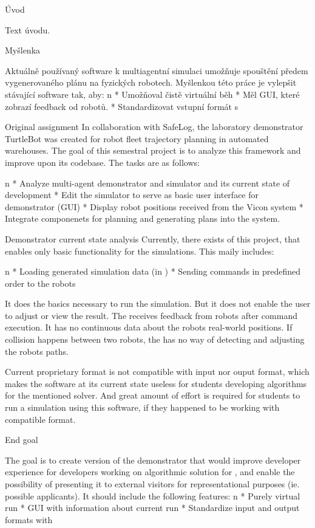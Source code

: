 \chap Úvod


Text úvodu.

\sec Myšlenka

Aktuálně používaný software k multiagentní simulaci umožňuje spouštění předem vygenerovaného plánu na fyzických robotech. Myšlenkou této práce je vylepšit stávající software tak, aby:
\begitems \style n
    * Umožňoval čistě virtuální běh
    * Měl GUI, které zobrazí feedback od robotů.
    * Standardizovat vstupní formát s \mapfIR
\enditems

\sec Original assignment
In collaboration with SafeLog, the laboratory demonstrator TurtleBot was created for robot fleet trajectory planning in automated warehouses. The goal of this semestral project is to analyze this framework and improve upon its codebase. The tasks are as follows:

\begitems \style n
    * Analyze multi-agent demonstrator and simulator {\mapfIR} and its current state of development 
    * Edit the simulator to serve as basic user interface for demonstrator (GUI)
    * Display robot positions received from the Vicon system
    * Integrate componenets for planning and generating plans into the system.
\enditems

\sec Demonstrator current state analysis
Currently, there exists {\oldRepo} of this project, that enables only basic functionality for the simulations. This maily includes:

\begitems \style n
    * Loading generated simulation data (in {\oldFormat})
    * Sending commands in predefined order to the robots
\enditems

It does the basics necessary to run the simulation. But it does not enable the user to adjust or view the result. The {\oldRepo} receives feedback from robots after command execution. It has no continuous data about the robots real-world positions. If collision happens between two robots, the {\oldRepo} has no way of detecting and adjusting the robots paths.

Current proprietary format is not compatible with {\mapfIR} input nor ouput format, which makes the software at its current state useless for students developing algorithms for the mentioned solver. And great amount of effort is required for students to run a simulation using this software, if they happened to be working with compatible format.

\sec End goal

The goal is to create version of the demonstrator that would improve developer experience for developers working on algorithmic solution for {\mapfIR}, and enable the possibility of presenting it to external visitors for representational purposes (ie. possible applicants).
It should include the following features:
\begitems \style n
    * Purely virtual run
    * GUI with information about current run
    * Standardize input and output formats with \mapfIR
\enditems




\bye
\endtt
